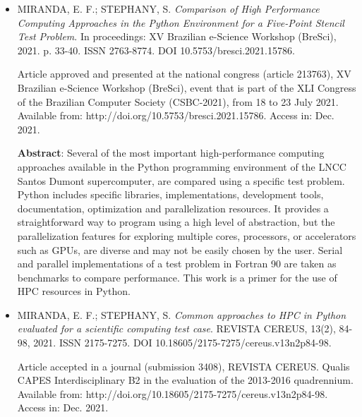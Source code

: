 \begin{itemize}

\item MIRANDA, E. F.; STEPHANY, S. \emph{Comparison of High Performance Computing Approaches in the Python Environment for a Five-Point Stencil Test Problem}. In proceedings: XV Brazilian e-Science Workshop (BreSci), 2021. p. 33-40. ISSN 2763-8774. DOI 10.5753/bresci.2021.15786.

Article approved and presented at the national congress (article 213763), XV Brazilian e-Science Workshop (BreSci), event that is part of the XLI Congress of the Brazilian Computer Society (CSBC-2021), from 18 to 23 July 2021. Available from: http://doi.org/10.5753/bresci.2021.15786. Access in: Dec. 2021.

\textbf{Abstract}: Several of the most important high-performance computing approaches available in the Python programming environment of the LNCC Santos Dumont supercomputer, are compared using a specific test problem. Python includes specific libraries, implementations, development tools, documentation, optimization and parallelization resources. It provides a straightforward way to program using a high level of abstraction, but the parallelization features for exploring multiple cores, processors, or accelerators such as GPUs, are diverse and may not be easily chosen by the user. Serial and parallel implementations of a test problem in Fortran 90 are taken as benchmarks to compare performance. This work is a primer for the use of HPC resources in Python.

\item MIRANDA, E. F.; STEPHANY, S. \emph{Common approaches to HPC in Python evaluated for a scientific computing test case}. REVISTA CEREUS, 13(2), 84-98, 2021. ISSN 2175-7275. DOI 10.18605/2175-7275/cereus.v13n2p84-98.

Article accepted in a journal (submission 3408), REVISTA CEREUS. Qualis CAPES Interdisciplinary B2 in the evaluation of the 2013-2016 quadrennium. Available from:  http://doi.org/10.18605/2175-7275/cereus.v13n2p84-98. Access in: Dec. 2021.


\end{itemize}

